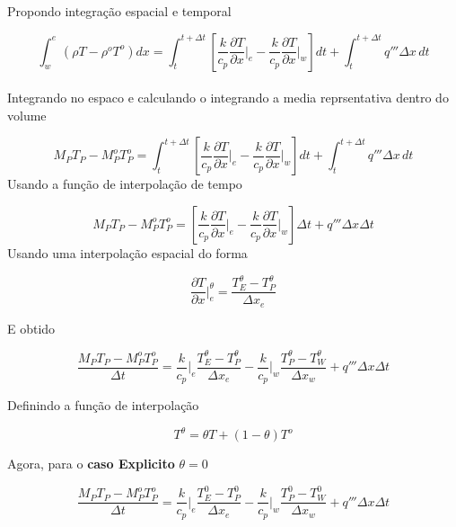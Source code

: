 \documentclass[]{article}
\begin{document}
Propondo integração espacial e temporal

\begin{equation}
	\int_w^e \left( \rho T - \rho^o T^o \right) dx =
	\int_t^{t+\Delta t} \left[ \frac{k}{c_p} \frac{\partial T}{\partial x} \bigg|_e - \frac{k}{c_p} \frac{\partial T}{\partial x} \bigg|_w \right] dt +
	\int_t^{t+\Delta t} q''' \Delta x \, dt
\end{equation}\\
Integrando no espaco e calculando o integrando a media reprsentativa dentro do volume

\begin{equation}
	M_P T_P - M_P^o T_P^o =
	\int_t^{t+\Delta t} \left[ \frac{k}{c_p} \frac{\partial T}{\partial x} \bigg|_e - \frac{k}{c_p} \frac{\partial T}{\partial x} \bigg|_w \right] dt +
	\int_t^{t+\Delta t} q''' \Delta x \, dt
\end{equation}
Usando a função de interpolação de tempo

\begin{equation}
	M_P T_P - M_P^o T_P^o =
	\left[ \frac{k}{c_p} \frac{\partial T}{\partial x} \bigg|_e - \frac{k}{c_p} \frac{\partial T}{\partial x} \bigg|_w \right] \Delta t +
	q''' \Delta x \Delta t
\end{equation}
Usando uma interpolação espacial do forma

\begin{equation}
	\frac{\partial T}{\partial x} \bigg|_e^\theta = \frac{T_E^\theta - T_P^\theta}{\Delta x_e}
\end{equation}

E obtido

\begin{equation}
	\frac{M_P T_P - M_P^o T_P^o}{\Delta t} =
	\frac{k}{c_p} \bigg|_e \frac{T_E^\theta - T_P^\theta}{\Delta x_e} -
	\frac{k}{c_p} \bigg|_w \frac{T_P^\theta - T_W^\theta}{\Delta x_w} + q'''  \Delta x \Delta t 
\end{equation}

Definindo a função de interpolação

\begin{equation}
	T^\theta = \theta T + (1 - \theta) T^o
\end{equation}

Agora, para o \textbf{caso Explicito} $\theta = 0$

\begin{equation}
	\frac{M_P T_P - M_P^o T_P^o}{\Delta t} =
	\frac{k}{c_p} \bigg|_e \frac{T_E^ 0 - T_P^ 0}{\Delta x_e} -
	\frac{k}{c_p} \bigg|_w \frac{T_P^ 0 - T_W^ 0}{\Delta x_w} + q'''  \Delta x \Delta t 
\end{equation}
\end{document}
